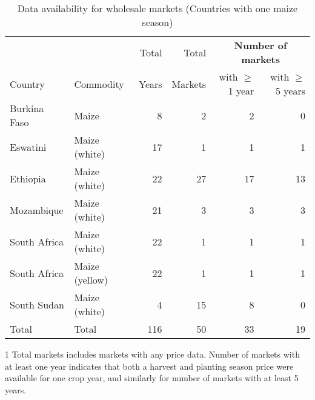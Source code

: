 \begin{table}[ht]
	\centering
	\begin{threeparttable}[t]
		\caption{Data availability for wholesale markets (Countries with one maize season)}
		\label{tab:avail_wholesale1}
		\begin{tabular}{|ll|rr|rr|}
			\hline
			&  & Total  & Total  & \multicolumn{2}{c}{\textbf{Number of markets}} \\ 
			Country & Commodity & Years & Markets & with $\geq$ 1 year & with $\geq$ 5 years \\ 
			\hline
Burkina Faso & Maize &   8 &   2 &   2 &   0 \\ 
  Eswatini & Maize (white) &  17 &   1 &   1 &   1 \\ 
  Ethiopia & Maize (white) &  22 &  27 &  17 &  13 \\ 
  Mozambique & Maize (white) &  21 &   3 &   3 &   3 \\ 
  South Africa & Maize (white) &  22 &   1 &   1 &   1 \\ 
  South Africa & Maize (yellow) &  22 &   1 &   1 &   1 \\ 
  South Sudan & Maize (white) &   4 &  15 &   8 &   0 \\ 
  \hline
  Total & Total & 116 &  50 &  33 &  19 \\ 
   \hline
\end{tabular}
\begin{tablenotes}
\item [1] \footnotesize Total markets includes markets with any price data. Number of markets with at least one year indicates that both a harvest and planting season price were available for one crop year, and similarly for number of markets with at least 5 years. 
\end{tablenotes}
\end{threeparttable}
\end{table}

